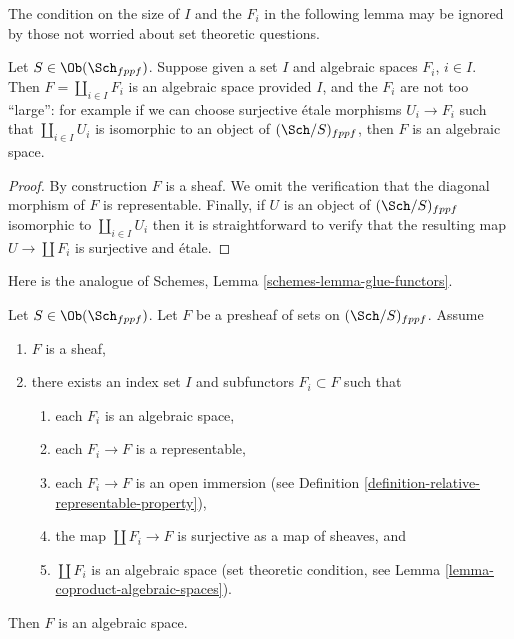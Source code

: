 \noindent
The condition on the size of $I$ and the $F_i$ in the
following lemma may be ignored by those not worried about
set theoretic questions.

\begin{lemma}
\label{lemma-coproduct-algebraic-spaces}
Let $S \in \Ob(\Sch_{fppf})$.
Suppose given a set $I$ and algebraic spaces $F_i$, $i \in I$.
Then $F = \coprod_{i \in I} F_i$ is an algebraic space
provided $I$, and the $F_i$ are not too ``large'': for example if we
can choose surjective \'etale morphisms $U_i \to F_i$ such that
$\coprod_{i \in I} U_i$ is isomorphic to an object of
$(\Sch/S)_{fppf}$, then $F$ is an algebraic space.
\end{lemma}

\begin{proof}
By construction $F$ is a sheaf. We omit the verification that the
diagonal morphism of $F$ is representable. Finally, if $U$ is an
object of $(\Sch/S)_{fppf}$ isomorphic to $\coprod_{i \in I} U_i$
then it is straightforward to verify that the resulting map
$U \to \coprod F_i$ is surjective and \'etale.
\end{proof}

\noindent
Here is the analogue of Schemes, Lemma \ref{schemes-lemma-glue-functors}.

\begin{lemma}
\label{lemma-glueing-algebraic-spaces}
Let $S \in \Ob(\Sch_{fppf})$.
Let $F$ be a presheaf of sets on $(\Sch/S)_{fppf}$.
Assume
\begin{enumerate}
\item $F$ is a sheaf,
\item there exists an index set $I$
and subfunctors $F_i \subset F$ such that
\begin{enumerate}
\item each $F_i$ is an algebraic space,
\item each $F_i \to F$ is a representable,
\item each $F_i \to F$ is an open immersion (see
Definition \ref{definition-relative-representable-property}),
\item the map $\coprod F_i \to F$ is surjective as a map of sheaves, and
\item $\coprod F_i$ is an algebraic space (set theoretic condition, see
Lemma \ref{lemma-coproduct-algebraic-spaces}).
\end{enumerate}
\end{enumerate}
Then $F$ is an algebraic space.
\end{lemma}

